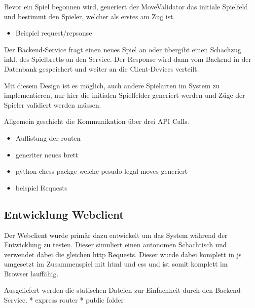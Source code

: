 Bevor ein Spiel begonnen wird, generiert der MoveValidator das initiale
Spielfeld und bestimmt den Spieler, welcher als erstes am Zug ist.

\begin{itemize}
\tightlist
\item
  Beispiel request/repsonse
\end{itemize}

Der Backend-Service fragt einen neues Spiel an oder übergibt einen
Schachzug inkl. des Spielbretts an den Service. Der Response wird dann
vom Backend in der Datenbank gespeichert und weiter an die
Client-Devices verteilt.

Mit diesem Design ist es möglich, auch andere Spielarten im System zu
implementieren, nur hier die initialen Spielfelder generiert werden und
Züge der Spieler validiert werden müssen.

Allgemein geschieht die Kommunikation über drei API Calls.

\begin{itemize}
\item
  Auflistung der routen
\item
  generiter neues brett
\item
  python chess packge welche pesudo legal moves generiert
\item
  beispiel Requests
\end{itemize}

\hypertarget{entwicklung-webclient}{%
\subsection{Entwicklung Webclient}\label{entwicklung-webclient}}

Der Webclient wurde primär dazu entwickelt um das System während der
Entwicklung zu testen. Dieser simuliert einen autonomen Schachtisch und
verwendet dabei die gleichen \gls{http} Requests. Dieser wurde dabei
komplett in \gls{js} umgesetzt im Zusammenspiel mit \gls{html} und
\gls{css} und ist somit komplett im Browser lauffähig.

Ausgeliefert werden die statischen Dateien zur Einfachheit durch den
Backend-Service. * express router * public folder

